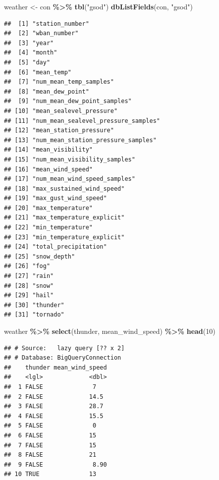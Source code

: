\documentclass[
]{krantz}
\newenvironment{Shaded}{\begin{snugshade}}{\end{snugshade}}
\newcommand{\DecValTok}[1]{\textcolor[rgb]{0.00,0.00,0.81}{#1}}
\newcommand{\KeywordTok}[1]{\textcolor[rgb]{0.13,0.29,0.53}{\textbf{#1}}}
\newcommand{\NormalTok}[1]{#1}
\newcommand{\OperatorTok}[1]{\textcolor[rgb]{0.81,0.36,0.00}{\textbf{#1}}}
\newcommand{\StringTok}[1]{\textcolor[rgb]{0.31,0.60,0.02}{#1}}
\begin{document}
\begin{Shaded}
\begin{Highlighting}[]
\NormalTok{weather \textless{}{-}}\StringTok{ }\NormalTok{con }\OperatorTok{\%\textgreater{}\%}
\StringTok{  }\KeywordTok{tbl}\NormalTok{(}\StringTok{"gsod"}\NormalTok{)}
\KeywordTok{dbListFields}\NormalTok{(con, }\StringTok{"gsod"}\NormalTok{)}
\end{Highlighting}
\end{Shaded}

\begin{verbatim}
##  [1] "station_number"                    
##  [2] "wban_number"                       
##  [3] "year"                              
##  [4] "month"                             
##  [5] "day"                               
##  [6] "mean_temp"                         
##  [7] "num_mean_temp_samples"             
##  [8] "mean_dew_point"                    
##  [9] "num_mean_dew_point_samples"        
## [10] "mean_sealevel_pressure"            
## [11] "num_mean_sealevel_pressure_samples"
## [12] "mean_station_pressure"             
## [13] "num_mean_station_pressure_samples" 
## [14] "mean_visibility"                   
## [15] "num_mean_visibility_samples"       
## [16] "mean_wind_speed"                   
## [17] "num_mean_wind_speed_samples"       
## [18] "max_sustained_wind_speed"          
## [19] "max_gust_wind_speed"               
## [20] "max_temperature"                   
## [21] "max_temperature_explicit"          
## [22] "min_temperature"                   
## [23] "min_temperature_explicit"          
## [24] "total_precipitation"               
## [25] "snow_depth"                        
## [26] "fog"                               
## [27] "rain"                              
## [28] "snow"                              
## [29] "hail"                              
## [30] "thunder"                           
## [31] "tornado"
\end{verbatim}

\begin{Shaded}
\begin{Highlighting}[]
\NormalTok{weather }\OperatorTok{\%\textgreater{}\%}
\StringTok{  }\KeywordTok{select}\NormalTok{(thunder, mean\_wind\_speed) }\OperatorTok{\%\textgreater{}\%}
\StringTok{  }\KeywordTok{head}\NormalTok{(}\DecValTok{10}\NormalTok{)}
\end{Highlighting}
\end{Shaded}

\begin{verbatim}
## # Source:   lazy query [?? x 2]
## # Database: BigQueryConnection
##    thunder mean_wind_speed
##    <lgl>             <dbl>
##  1 FALSE              7   
##  2 FALSE             14.5 
##  3 FALSE             28.7 
##  4 FALSE             15.5 
##  5 FALSE              0   
##  6 FALSE             15   
##  7 FALSE             15   
##  8 FALSE             21   
##  9 FALSE              8.90
## 10 TRUE              13
\end{verbatim}
\end{document}
